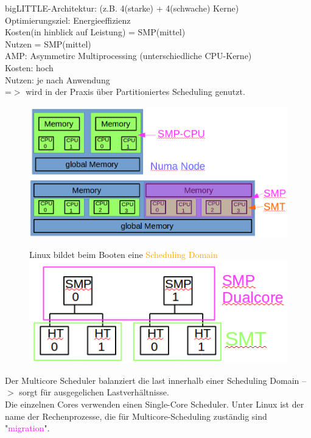 \documentclass[12pt,a4paper,oneside,ngerman]{article}
\begin{document}
bigLITTLE-Architektur: (z.B. 4(starke) + 4(schwache) Kerne) \\
Optimierungsziel: Energieeffizienz\\
Kosten(in hinblick auf Leistung) = SMP(mittel)\\
Nutzen = SMP(mittel)\\

AMP: Asymmetirc Multiprocessing (unterschiedliche CPU-Kerne)\\
Kosten: hoch\\
Nutzen: je nach Anwendung\\
=$>$ wird in der Praxis über Partitioniertes Scheduling genutzt.

\begin{figure}[H]
	\centering
	\includegraphics[scale=0.4]{umlet/numa_node.png}
\end{figure}

\begin{figure}[H]
	Linux bildet beim Booten eine \textcolor{orange}{Scheduling Domain}
	\centering
	\includegraphics[scale=0.6]{umlet/scheduling_domain.png}
\end{figure}

Der Multicore Scheduler balanziert die last innerhalb einer Scheduling Domain --$>$ sorgt für ausgegelichen Lastverhältnisse.\\
Die einzelnen Cores verwenden einen Single-Core Scheduler.
Unter Linux ist der name der Rechenprozesse, die für Multicore-Scheduling zuständig sind "\textcolor{magenta}{migration}".\\
\end{document}
